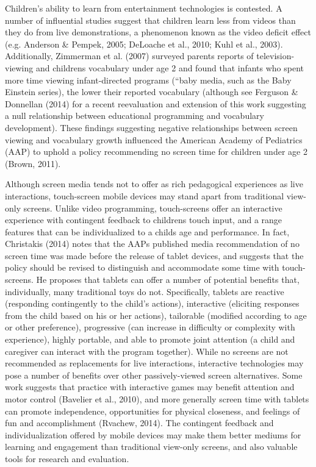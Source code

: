 \documentclass[man,noapacite]{apa2}
\begin{document}
Children's ability to learn from entertainment technologies is contested. A number of influential studies suggest that children learn less from videos than they do from live demonstrations, a phenomenon known as the video deficit effect (e.g. Anderson \& Pempek, 2005; DeLoache et al., 2010; Kuhl et al., 2003). Additionally, Zimmerman et al. (2007) surveyed parents reports of television-viewing and childrens vocabulary under age 2 and found that infants who spent more time viewing infant-directed programs (“baby media, such as the Baby Einstein series), the lower their reported vocabulary (although see Ferguson \& Donnellan (2014) for a recent reevaluation and extension of this work suggesting a null relationship between educational programming and vocabulary development). These findings suggesting negative relationships between screen viewing and vocabulary growth influenced the American Academy of Pediatrics (AAP) to uphold a policy recommending no screen time for children under age 2 (Brown, 2011).

Although screen media tends not to offer as rich pedagogical experiences as live interactions, touch-screen mobile devices may stand apart from traditional view-only screens. Unlike video programming, touch-screens offer an interactive experience with contingent feedback to childrens touch input, and a range features that can be individualized to a childs age and performance. In fact, Christakis (2014) notes that the AAPs published media recommendation of no screen time was made before the release of tablet devices, and suggests that the policy should be revised to distinguish and accommodate some time with touch-screens. He proposes that tablets can offer a number of potential benefits that, individually, many traditional toys do not. Specifically, tablets are reactive (responding contingently to the child’s actions), interactive (eliciting responses from the child based on his or her actions), tailorable (modified according to age or other preference), progressive (can increase in difficulty or complexity with experience), highly portable, and able to promote joint attention (a child and caregiver can interact with the program together). While no screens are not recommended as replacements for live interactions, interactive technologies may pose a number of benefits over other passively-viewed screen alternatives. Some work suggests that practice with interactive games may benefit attention and motor control (Bavelier et al., 2010), and more generally screen time with tablets can promote independence, opportunities for physical closeness, and feelings of fun and accomplishment (Rvachew, 2014). The contingent feedback and individualization offered by mobile devices may make them better mediums for learning and engagement than traditional view-only screens, and also valuable tools for research and evaluation.
\end{document}

